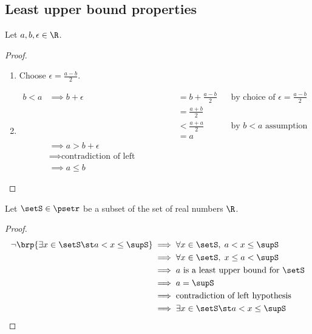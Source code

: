 \subsection{Least upper bound properties}
\begin{theorem}
\label{thm:R_abe}
Let $a,b,\epsilon\in\R$.
\end{theorem}
\begin{proof}
\begin{enumerate}
  \item Choose $\epsilon=\frac{a-b}{2}$.
  \item
    \begin{align*}
      b<a
        &\implies b+\epsilon
         && = b + \frac{a-b}{2}
        &&    \text{by choice of $\epsilon=\frac{a-b}{2}$}
      \\&&& = \frac{a+b}{2}
      \\&&& < \frac{a+a}{2}
         && \text{by $b<a$ assumption}
      \\&&& = a
      \\&\implies a> b+\epsilon
      \\&\implies \text{contradiction of left hypotheses}
      \\&\implies a \le b
    \end{align*}
\end{enumerate}
\end{proof}

\begin{theorem}
\label{thm:R_sup_axs}
Let $\setS\in\psetr$ be a subset of the set of real numbers $\R$.
\end{theorem}
\begin{proof}
\begin{align*}
  \lnot\brp{\exists x\in\setS \st a<x\le\supS}
    &\implies \forall x\in\setS,\;  a<x\le\supS
  \\&\implies \forall x\in\setS,\;  x\le a<\supS
  \\&\implies \text{$a$ is a least upper bound for $\setS$}
  \\&\implies a=\supS
  \\&\implies \text{contradiction of left hypothesis}
  \\&\implies \exists x\in\setS \st a<x\le\supS
\end{align*}
\end{proof}

